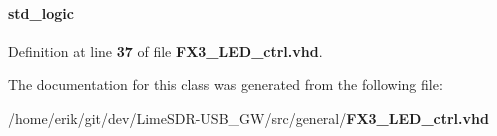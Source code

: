 \paragraph[{led\+\_\+r\+\_\+ovr}]{ {\bfseries \textcolor{comment}{std\+\_\+logic}\textcolor{vhdlchar}{ }} \hspace{0.3cm}{\ttfamily [Signal]}}\label{classFX3__LED__ctrl_1_1arch_a67886c5045d27f249f9daa43213ebecd}


Definition at line {\bf 37} of file {\bf F\+X3\+\_\+\+L\+E\+D\+\_\+ctrl.\+vhd}.



The documentation for this class was generated from the following file\+:\begin{DoxyCompactItemize}
\item 
/home/erik/git/dev/\+Lime\+S\+D\+R-\/\+U\+S\+B\+\_\+\+G\+W/src/general/{\bf F\+X3\+\_\+\+L\+E\+D\+\_\+ctrl.\+vhd}\end{DoxyCompactItemize}
